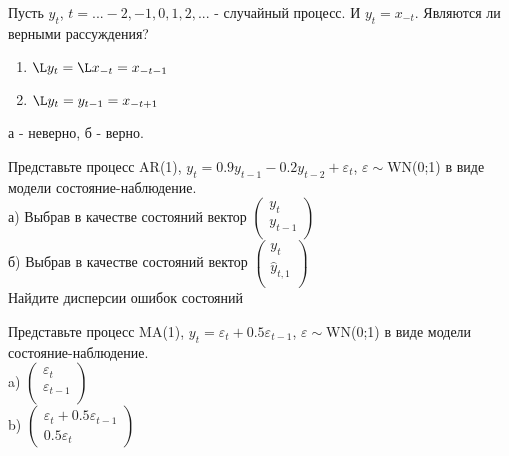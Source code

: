 \documentclass[pdftex,11pt,openany]{book}\usepackage[]{graphicx}\usepackage[]{color}
\begin{document}
\begin{problem}
Пусть $y_{t}$, $t=...-2,-1,0,1,2,...$ - случайный процесс. И $y_{t}=x_{-t}$. Являются ли верными рассуждения?
\begin{enumerate}
\item $\L y_{t}=\L x_{-t}=x_{-t-1}$
\item $\L y_{t}=y_{t-1}=x_{-t+1}$ 
\end{enumerate}
\end{problem}

\begin{solution}
а - неверно, б - верно. 
\end{solution}





\begin{problem}
Представьте процесс AR(1),
$y_{t}=0.9y_{t-1}-0.2y_{t-2}+\varepsilon_{t}$,
$\varepsilon\sim$WN(0;1) в виде модели состояние-наблюдение. \\
а) Выбрав в качестве состояний вектор $\left(%
\begin{array}{c}
  y_{t} \\
  y_{t-1} \\
\end{array}%
\right)$ \\
б) Выбрав в качестве состояний вектор $\left(%
\begin{array}{c}
  y_{t} \\
  \hat{y}_{t,1} \\
\end{array}%
\right)$ \\
Найдите дисперсии ошибок состояний 
\end{problem}

\begin{solution}
\end{solution}

\begin{problem}
Представьте процесс MA(1),
$y_{t}=\varepsilon_{t}+0.5\varepsilon_{t-1}$,
$\varepsilon\sim$WN(0;1) в виде модели состояние-наблюдение. \\
a) $\left(%
\begin{array}{c}
  \varepsilon_{t} \\
  \varepsilon_{t-1} \\
\end{array}%
\right)$ \\
b) $\left(%
\begin{array}{c}
  \varepsilon_{t}+0.5\varepsilon_{t-1} \\
  0.5\varepsilon_{t} 
\end{array}%
\right)$ 
\end{problem}
\end{document}
